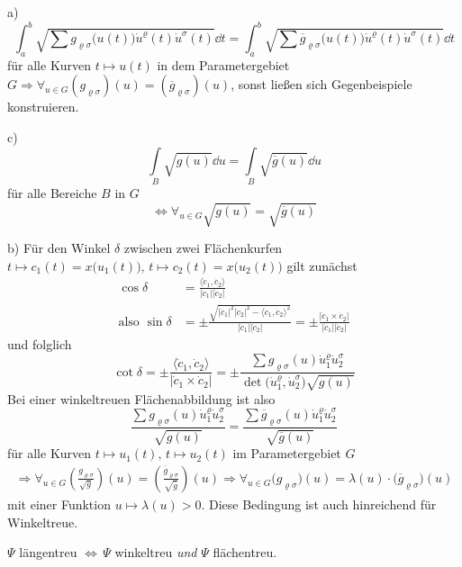 \begin{beweis}
 \item[a)]
 \[
  \int_a^b \sqrt{\sum g_{\varrho \sigma} \big(u(t)\big) \dot u^{\varrho}(t) \dot u^\sigma (t)} \dd t = \int_a^b \sqrt{\sum \overline g_{\varrho \sigma} \big(u(t)\big) \dot u^\varrho (t) \dot u^\sigma(t)} \dd t
 \]
 für alle Kurven \(t \mapsto u(t)\) in dem Parametergebiet \(G \Rightarrow \forall_{u \in G} (g_{\varrho \sigma})(u) = (\overline g_{\varrho \sigma})(u)\), sonst ließen sich Gegenbeispiele konstruieren.
 \item[c)]
 \[
  \int\limits_B \sqrt{g(u)} \dd u = \int\limits_B \sqrt{\overline g(u)}\dd u
 \]
 für alle Bereiche \(B\) in \(G\)
 \[
  \Leftrightarrow \forall_{u\in G} \sqrt{g(u)} = \sqrt{\overline{g}(u)}
 \]
 \item[b)] Für den Winkel \(\delta\) zwischen zwei Flächenkurfen \(t \mapsto c_1(t) = x\big(u_1(t)\big), \, t \mapsto c_2(t) = x\big(u_2(t)\big)\) gilt zunächst
 \begin{align*}
  \cos\delta &= \frac{\langle \dot c_1, \dot c_2\rangle}{|\dot c_1| |\dot c_2|} \\
  \text{also } \sin \delta &= \pm \frac{\sqrt{|\dot c_1|^2 |\dot c_2|^2 - \langle \dot c_1, \dot c_2\rangle^2}}{|\dot c_1||\dot c_2|} = \pm \frac{|\dot c_1 \times \dot c_2|}{|\dot c_1||\dot c_2|}
 \end{align*}
 und folglich
 \[
  \cot \delta = \pm \frac{\langle\dot c_1, \dot c_2\rangle}{|\dot c_1\times \dot c_2|} = \pm \frac{\sum g_{\varrho \sigma}(u) \dot u_1^\varrho \dot u_2^\sigma}{\det\big(\dot u_1^\varrho, \dot u_2^\sigma\big) \sqrt{{g(u)}}}
 \]
 Bei einer winkeltreuen Flächenabbildung ist also
 \[
  \frac{\sum g_{\varrho \sigma} (u) \dot u_1^\varrho \dot u_2^\sigma}{\sqrt{ g(u)}} = \frac{\sum \overline g_{\varrho \sigma} (u) \dot u_1^\varrho \dot u_2^\sigma}{\sqrt{\overline g(u)}}
 \]
 für alle Kurven \(t \mapsto u_1(t), \, t \mapsto u_2(t)\) im Parametergebiet \(G\)
 \begin{align*}
  \Rightarrow \forall_{u \in G} \left(\frac{g_{\varrho \sigma}}{\sqrt{g}}\right)(u) = \left(\frac{\overline g_{\varrho \sigma}}{\sqrt{\overline g}}\right)(u) \Rightarrow \forall_{u \in G} \big(g_{\varrho \sigma}\big)(u) = \lambda(u) \cdot \big(\overline g_{\varrho \sigma}\big)(u)
 \end{align*}
 mit einer Funktion \(u \mapsto \lambda(u) > 0\). Diese Bedingung ist auch hinreichend für Winkeltreue.
\end{beweis}

\begin{folgerung}
\centering
  \(\Psi\) längentreu \(\Leftrightarrow \, \Psi\) winkeltreu \textit{und} \(\Psi\) flächentreu.
\end{folgerung}

